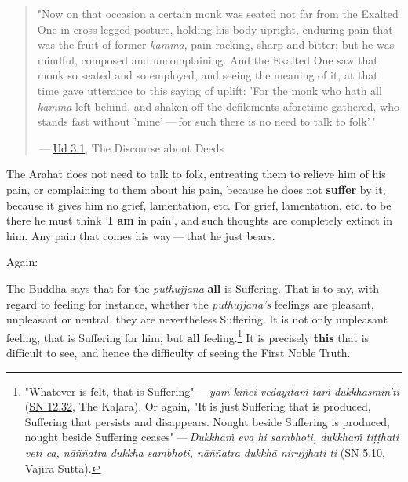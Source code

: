 \begin{quotation}
"Now on that occasion a certain monk was seated not far from the Exalted
One in cross-legged posture, holding his body upright, enduring pain
that was the fruit of former \emph{kamma}, pain racking, sharp and bitter;
but he was mindful, composed and uncomplaining. And the Exalted One saw
that monk so seated and so employed, and seeing the meaning of it, at
that time gave utterance to this saying of uplift: 'For the monk who
hath all \emph{kamma} left behind, and shaken off the defilements aforetime
gathered, who stands fast without 'mine' — for such there is no need to
talk to folk'."


 — \href{https://suttacentral.net/ud3.1/en/anandajoti}{Ud 3.1}, The Discourse about Deeds


\end{quotation}

The Arahat does not need to talk to folk, entreating them to relieve him
of his pain, or complaining to them about his pain, because he does not
\textbf{suffer} by it, because it gives him no grief, lamentation, etc. For
grief, lamentation, etc. to be there he must think '\textbf{I am} in pain',
and such thoughts are completely extinct in him. Any pain that comes his
way — that he just bears.


Again:


The Buddha says that for the \emph{puthujjana} \textbf{all} is Suffering. That is to
say, with regard to feeling for instance, whether the \emph{puthujjana’s}
feelings are pleasant, unpleasant or neutral, they are nevertheless
Suffering. It is not only unpleasant feeling, that is Suffering for him,
but \textbf{all} feeling.\footnote{"Whatever is felt, that is Suffering" — \emph{yaṁ kiñci vedayitaṁ taṁ dukkhasmin’ti} (\href{https://suttacentral.net/sn12.32/en/bodhi}{SN 12.32}, The Kaḷara). Or again, "It is just Suffering that is produced, Suffering that persists and disappears. Nought beside Suffering is produced, nought beside Suffering ceases" — \emph{Dukkhaṁ eva hi sambhoti, dukkhaṁ tiṭṭhati veti ca, nāññatra dukkha sambhoti, nāññatra dukkhā nirujjhati ti} (\href{https://suttacentral.net/sn5.10/en/bodhi}{SN 5.10}, Vajirā Sutta).}
It is precisely \textbf{this} that is difficult to see,
and hence the difficulty of seeing the First Noble Truth.


